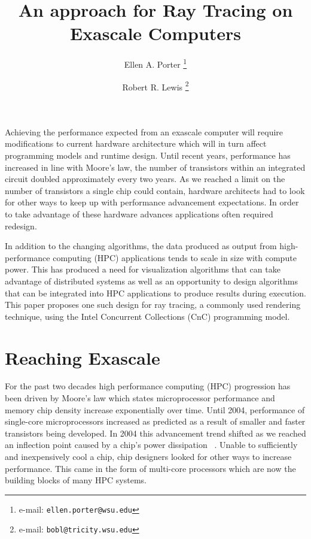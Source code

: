 \documentclass{vgtc}                          %
\title{An approach for Ray Tracing on Exascale Computers}
\author{
  Ellen A. Porter
  \thanks{e-mail: \texttt{ellen.porter@wsu.edu}} %
  \and
  Robert R. Lewis
  \thanks{e-mail: \texttt{bobl@tricity.wsu.edu}}}
\affiliation{
  \scriptsize Washington State University, Tri-Cities \\
  Program in Engineering and Computer Science}
\begin{document}



\maketitle


Achieving the performance expected from an exascale computer will require modifications to current hardware architecture which will in turn affect programming models and runtime design.  Until recent years, performance has increased in line with Moore's law, the number of transistors within an integrated circuit doubled approximately every two years.  As we reached a limit on the number of transistors a single chip could contain, hardware architects had to look for other ways to keep up with performance advancement expectations.  In order to take advantage of these hardware advances applications often required redesign. 

In addition to the changing algorithms, the data produced as output from high-performance computing (HPC) applications tends to scale in size with compute power.  This has produced a need for visualization algorithms that can take advantage of distributed systems as well as an opportunity to design algorithms that can be integrated into HPC applications to produce results during execution.  This paper proposes one such design for ray tracing, a commonly used rendering technique, using the Intel Concurrent Collections (CnC) programming model.   


\section{Reaching Exascale}

For the past two decades high performance computing (HPC) progression has been driven by Moore's law which states microprocessor performance and memory chip density increase exponentially over time.  Until 2004, performance of single-core microprocessors increased as predicted as a result of smaller and faster transistors being developed.  In 2004 this advancement trend shifted as we reached an inflection point caused by a chip’s power dissipation ~\cite{kogge2013exascale}.  Unable to sufficiently and inexpensively cool a chip, chip designers looked for other ways to increase performance.  This came in the form of multi-core processors which are now the building blocks of many HPC systems.
\end{document}
